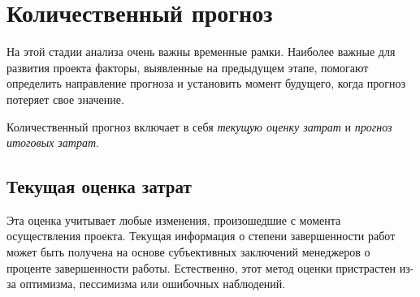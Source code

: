 \section{Количественный прогноз}

На этой стадии анализа очень важны временные рамки. Наиболее важные для развития проекта факторы, выявленные на предыдущем этапе, помогают определить направление прогноза и установить момент будущего, когда прогноз потеряет свое значение.

Количественный прогноз включает в себя \textit{текущую оценку затрат} и \textit{прогноз итоговых затрат}.

\subsection{Текущая оценка затрат}
Эта оценка учитывает любые изменения, произошедшие с момента осуществления проекта. 
Текущая информация о степени завершенности работ может быть получена на основе субъективных заключений менеджеров о проценте завершенности работы. 
Естественно, этот метод оценки пристрастен из-за оптимизма, пессимизма или ошибочных наблюдений.

